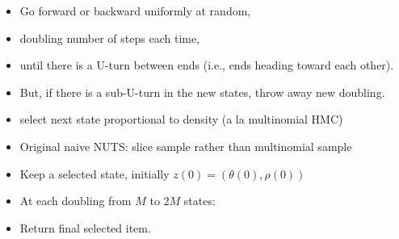 \documentclass[10pt]{report}
\begin{document}
\begin{itemize}
\item Go forward or backward uniformly at random,
\item doubling number of steps each time,
\item until there is a U-turn between ends (i.e., ends heading toward each other).
\item But, if there is a sub-U-turn in the new states, throw away new doubling.
\item select next state proportional to density (a la multinomial HMC)
  \vfill
\item Original naive NUTS: slice sample rather than multinomial sample
\end{itemize}

\begin{itemize}
\item Keep a selected state, initially $z(0) = (\theta(0), \rho(0))$
\item At each doubling from $M$ to $2M$ states:
\item Return final selected item.
\end{itemize}
\end{document}
